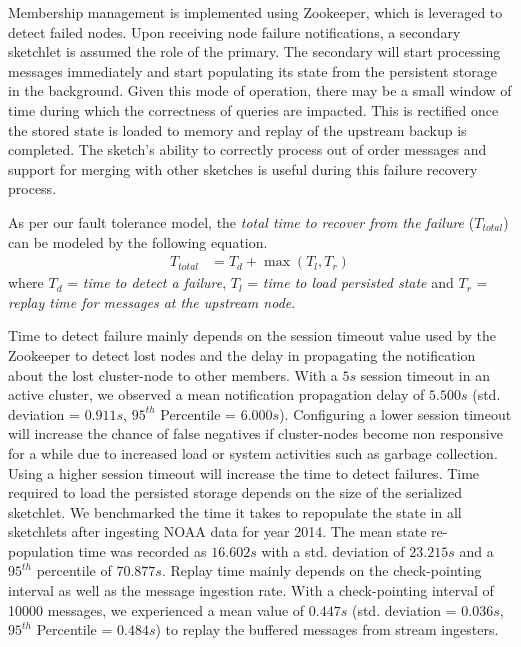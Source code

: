 Membership management is implemented using Zookeeper, which is leveraged to detect failed nodes.
Upon receiving node failure notifications, a secondary sketchlet is assumed the role of the primary.
The secondary will start processing messages immediately and start populating its state from the persistent storage in the background.
Given this mode of operation, there may be a small window of time during which the correctness of queries are impacted.
This is rectified once the stored state is loaded to memory and replay of the upstream backup is completed.
The sketch's ability to correctly process out of order messages and support for merging with other sketches is useful during this failure recovery process.

As per our fault tolerance model, the \textit{total time to recover from the failure} ($T_{total}$) can be modeled by the following equation.
\begin{align*}
    T_{total} &= T_{d} + \max{(T_{l}, T_{r})}      
\end{align*}
where $T_{d}$ = \textit{time to detect a failure}, $T_{l}$ = \textit{time to load persisted state} and $T_{r}$ = \textit{replay time for messages at the upstream node}.

Time to detect failure mainly depends on the session timeout value used by the Zookeeper to detect lost nodes and the delay in propagating the notification about the lost cluster-node to other members. With a $5s$ session timeout in an active cluster, we observed a mean notification propagation delay of $5.500s$ (std. deviation = $0.911s$, $95^{th}$ Percentile = $6.000s$). Configuring a lower session timeout will increase the chance of false negatives if cluster-nodes become non responsive for a while due to increased load or system activities such as garbage collection. Using a higher session timeout will increase the time to detect failures. Time required to load the persisted storage depends on the size of the serialized sketchlet. We benchmarked the time it takes to repopulate the state in all sketchlets after ingesting NOAA data for year 2014. The mean state re-population time was recorded as $16.602s$ with a std. deviation of $23.215s$ and a $95^{th}$ percentile of $70.877s$. Replay time mainly depends on the check-pointing interval as well as the message ingestion rate. With a check-pointing interval of 10000 messages, we experienced a mean value of $0.447s$ (std. deviation = $0.036s$, $95^{th}$ Percentile = $0.484s$) to replay the buffered messages from stream ingesters.  														


